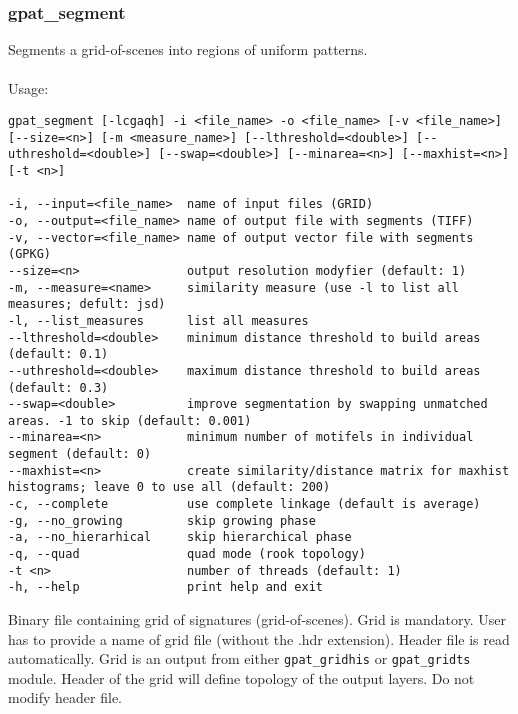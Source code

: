 \subsubsection{gpat\_segment}
Segments a grid-of-scenes into regions of uniform patterns.
\\\\
Usage:

\begin{minipage}{\linewidth}
\begin{lstlisting}
gpat_segment [-lcgaqh] -i <file_name> -o <file_name> [-v <file_name>] [--size=<n>] [-m <measure_name>] [--lthreshold=<double>] [--uthreshold=<double>] [--swap=<double>] [--minarea=<n>] [--maxhist=<n>] [-t <n>]

-i, --input=<file_name>  name of input files (GRID)
-o, --output=<file_name> name of output file with segments (TIFF)
-v, --vector=<file_name> name of output vector file with segments (GPKG)
--size=<n>               output resolution modyfier (default: 1)
-m, --measure=<name>     similarity measure (use -l to list all measures; defult: jsd)
-l, --list_measures      list all measures
--lthreshold=<double>    minimum distance threshold to build areas (default: 0.1)
--uthreshold=<double>    maximum distance threshold to build areas (default: 0.3)
--swap=<double>          improve segmentation by swapping unmatched areas. -1 to skip (default: 0.001)
--minarea=<n>            minimum number of motifels in individual segment (default: 0)
--maxhist=<n>            create similarity/distance matrix for maxhist histograms; leave 0 to use all (default: 200)
-c, --complete           use complete linkage (default is average)
-g, --no_growing         skip growing phase
-a, --no_hierarhical     skip hierarchical phase
-q, --quad               quad mode (rook topology)
-t <n>                   number of threads (default: 1)
-h, --help               print help and exit
\end{lstlisting}
\end{minipage}


Binary file containing grid of signatures (grid-of-scenes). 
Grid is mandatory. 
User has to provide a name of grid file (without the .hdr extension). 
Header file is read automatically. 
Grid is an output from either {\tt gpat\_gridhis} or {\tt gpat\_gridts} module. 
Header of the grid will define topology of the output layers. 
Do not modify header file.



